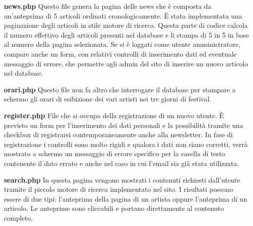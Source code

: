 \documentclass[10pt, a4paper]{article}
\begin{document}
\textbf{news.php}
Questo file genera la pagina delle news che è composta da un’anteprima di 5 articoli ordinati cronologicamente.
È stata implementata una paginazione degli articoli in stile motore di ricerca. Questa parte di codice calcola il numero effettivo degli articoli presenti nel database e li stampa di 5 in 5 in base al numero della pagina selezionata.
Se si è loggati come utente amministratore, compare anche un form, con relativi controlli di inserimento dati ed eventuale messaggio di errore, che permette agli admin del sito di inserire un nuovo articolo nel database.


\textbf{orari.php}
Questo file non fa altro che interrogare il database per stampare a schermo gli orari di esibizione dei vari artisti nei tre giorni di festival. 

\textbf{register.php}
File che si occupa della registrazione di un nuovo utente.
È previsto un form per l’inserimento dei dati personali e la possibilità tramite una checkbox di registrarsi contemporaneamente anche alla newsletter. In fase di registrazione i controlli sono molto rigidi e qualora i dati non siano corretti, verrà mostrato a schermo un messaggio di errore specifico per la casella di testo contenente il dato errato e anche nel caso in cui l’email sia già stata utilizzata.

\textbf{search.php}
In questa pagina vengono mostrati i contenuti richiesti dall’utente tramite il piccolo motore di ricerca implementato nel sito.
I risultati possono essere di due tipi: l’anteprima della pagina di un artista oppure l’anteprima di un articolo.
Le anteprime sono cliccabili e portano direttamente al contenuto completo.
\end{document}
